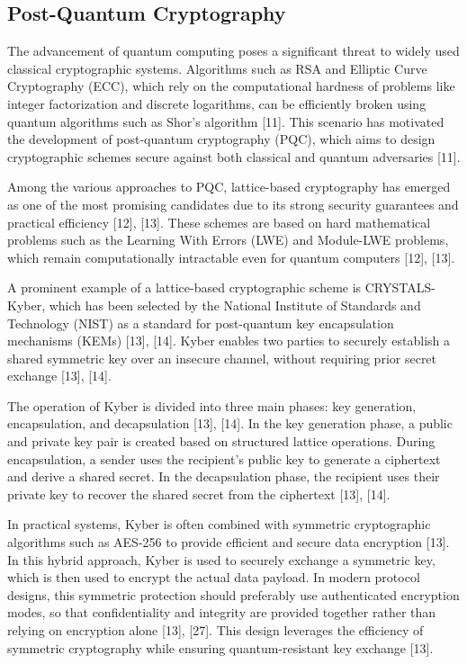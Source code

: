 \documentclass[12pt,a4paper]{article}
\begin{document}
\subsection{Post-Quantum Cryptography}

The advancement of quantum computing poses a significant threat to widely used classical cryptographic systems. Algorithms such as RSA and Elliptic Curve Cryptography (ECC), which rely on the computational hardness of problems like integer factorization and discrete logarithms, can be efficiently broken using quantum algorithms such as Shor's algorithm [11]. This scenario has motivated the development of post-quantum cryptography (PQC), which aims to design cryptographic schemes secure against both classical and quantum adversaries [11].

Among the various approaches to PQC, lattice-based cryptography has emerged as one of the most promising candidates due to its strong security guarantees and practical efficiency [12], [13]. These schemes are based on hard mathematical problems such as the Learning With Errors (LWE) and Module-LWE problems, which remain computationally intractable even for quantum computers [12], [13].

A prominent example of a lattice-based cryptographic scheme is CRYSTALS-Kyber, which has been selected by the National Institute of Standards and Technology (NIST) as a standard for post-quantum key encapsulation mechanisms (KEMs) [13], [14]. Kyber enables two parties to securely establish a shared symmetric key over an insecure channel, without requiring prior secret exchange [13], [14].

The operation of Kyber is divided into three main phases: key generation, encapsulation, and decapsulation [13], [14]. In the key generation phase, a public and private key pair is created based on structured lattice operations. During encapsulation, a sender uses the recipient's public key to generate a ciphertext and derive a shared secret. In the decapsulation phase, the recipient uses their private key to recover the shared secret from the ciphertext [13], [14].

In practical systems, Kyber is often combined with symmetric cryptographic algorithms such as AES-256 to provide efficient and secure data encryption [13]. In this hybrid approach, Kyber is used to securely exchange a symmetric key, which is then used to encrypt the actual data payload. In modern protocol designs, this symmetric protection should preferably use authenticated encryption modes, so that confidentiality and integrity are provided together rather than relying on encryption alone [13], [27]. This design leverages the efficiency of symmetric cryptography while ensuring quantum-resistant key exchange [13].
\end{document}
